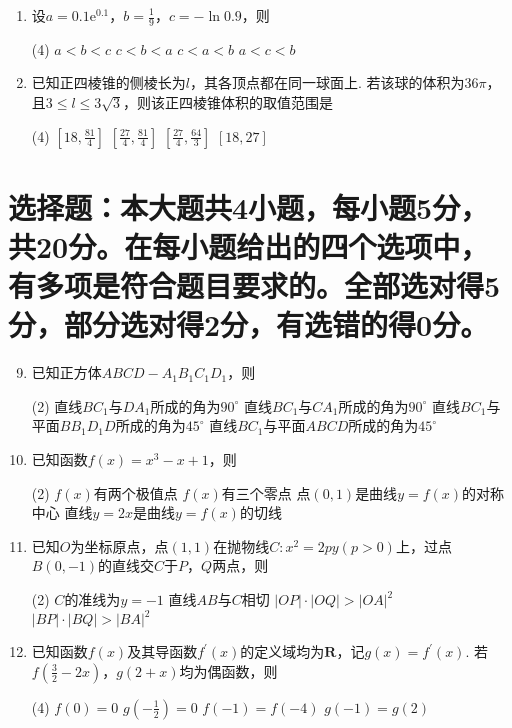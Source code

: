\documentclass[11pt,space]{ctexart} %
\begin{document}
\begin{enumerate}[itemsep=0.3em,topsep=0pt]
	\item  设$a=0.1\mathrm{e}^{0.1}$，$b=\frac{1}{9}$，$c=-\ln 0.9$，则
	\begin{tasks}(4)
	\task $a<b<c$ \task $c<b<a$ \task $c<a<b$ \task $a<c<b$
	\end{tasks}
	\item  已知正四棱锥的侧棱长为$l$，其各顶点都在同一球面上. 若该球的体积为$36\pi$，且$3\leqslant l\leqslant 3\sqrt{3}$，则该正四棱锥体积的取值范围是
	\begin{tasks}(4)
	\task $[18,\frac{81}{4}]$ \task $[\frac{27}{4},\frac{81}{4}]$ \task $[\frac{27}{4},\frac{64}{3}]$ \task $\left[18,27\right]$
	\end{tasks}
	
\end{enumerate}

\section{选择题：本大题共4小题，每小题5分，共20分。在每小题给出的四个选项中，有多项是符合题目要求的。全部选对得5分，部分选对得2分，有选错的得0分。}

\begin{enumerate}[itemsep=0.3em,topsep=0pt]
	\setcounter{enumi}{8}
	\item  已知正方体$ABCD-A_1B_1C_1D_1$，则
	\begin{tasks}(2)
	\task 直线$BC_1$与$DA_1$所成的角为$90^{\circ}$ 
	\task 直线$BC_1$与$CA_1$所成的角为$90^{\circ}$ 
	\task 直线$BC_1$与平面$BB_1D_1D$所成的角为$45^{\circ}$ 
	\task 直线$BC_1$与平面$ABCD$所成的角为$45^{\circ}$ 
	\end{tasks}

   \item  已知函数$f(x)=x^3-x+1$，则
	\begin{tasks}(2)
	\task $f(x)$有两个极值点 \task $f(x)$有三个零点
	\task 点$(0,1)$是曲线$y=f(x)$的对称中心 \task 直线$y=2x$是曲线$y=f(x)$的切线
	\end{tasks}

   \item  已知$O$为坐标原点，点$(1,1)$在抛物线$C:x^2=2py(p>0)$上，过点$B(0,-1)$的直线交$C$于$P$，$Q$两点，则
   \begin{tasks}(2)
   \task $C$的准线为$y=-1$
   \task 直线$AB$与$C$相切
   \task $|OP|\cdot|OQ|>|OA|^2$
   \task $|BP|\cdot|BQ|>|BA|^2$
   \end{tasks}

   \item 已知函数$f(x)$及其导函数$f^{\prime}(x)$的定义域均为$\mathbf{R}$，记$g(x)=f^{\prime}(x)$. 若$f(\frac{3}{2}-2x)$，$g(2+x)$均为偶函数，则
	\begin{tasks}(4)
		\task $f(0)=0$ \task $g(-\frac{1}{2})=0$ \task $f(-1)=f(-4)$ \task $g(-1)=g(2)$
	\end{tasks}

\end{enumerate}
\end{document}
